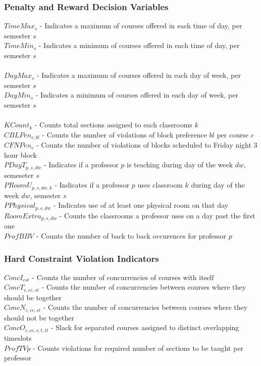 \documentclass[11pt, oneside]{article}   	%
\begin{document}
\subsubsection{Penalty and Reward Decision Variables}
$TimeMax_{s}$ - Indicates a maximum of courses offered in each time of day, per semester $s$ \\
$TimeMin_{s}$ - Indicates a minimum of courses offered in each time of day, per semester $s$ \\ \\
$DayMax_{s}$ - Indicates a maximum of courses offered in each day of week, per semester $s$ \\
$DayMin_{s}$ - Indicates a minimum of courses offered in each day of week, per semester $s$ \\ \\
$KCount_{k}$ - Counts total sections assigned to each classrooms $k$ \\ 
$CBLPen_{c,bl}$ - Counts the number of violations of block preference $bl$ per course $c$   \\
$CFNPen_{c}$ - Counts the number of violations of blocks scheduled to Friday night 3 hour block \\
$PDayT_{p,s,dw}$ - Indicates if a professor $p$ is teaching during day of the week $dw$, semeseter $s$ \\ 
$PRoomU_{p,s,dw,k}$ - Indicates if a professor $p$ uses classroom $k$ during day of the week $dw$, semester $s$ \\
$PPhysical_{p,s,dw}$ - Indicates use of at least one physical room on that day\\
$RoomExtra_{p,s,dw}$ - Counts the classrooms a professor uses on a day past the first one \\
$ProfBBV_{}$ - Counts the number of back to back occurences for professor $p$ 


\subsubsection{Hard Constraint Violation Indicators}
$ConcI_{cst}$ - Counts the number of concurrencies of courses with itself \\
$ConcT_{c,cc,st}$ - Counts the number of concurrencies between courses where they should be together\\
$ConcN_{c,cc,st}$ - Counts the number of concurrencies between courses where they should not be together\\
$ConcO_{c,cc,s,t,tt}$ - Slack for separated courses assigned to distinct overlapping timeslots\\
$ProfTV{p}$ - Counts violations for required number of sections to be taught per professor
\end{document}
